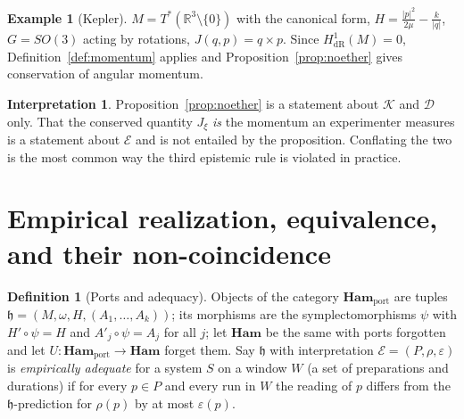 \documentclass[10pt,a4paper]{article}
\theoremstyle{plain}
\theoremstyle{definition}
\newtheorem{definition}[theorem]{Definition}
\newtheorem{interpretation}[theorem]{Interpretation}
\newtheorem{example}[theorem]{Example}
\newcommand{\Ham}{\mathbf{Ham}}
\newcommand{\HamP}{\mathbf{Ham}_{\mathrm{port}}}
\newcommand{\dR}{\mathrm{dR}}
\newcommand{\R}{\mathbb{R}}
\begin{document}
\begin{example}[Kepler]
\label{ex:kepler}
$M = T^*(\R^3\setminus\{0\})$ with the canonical form, $H = \frac{|p|^2}{2\mu} - \frac{k}{|q|}$, $G = SO(3)$ acting by rotations, $J(q,p) = q\times p$. Since $H^1_{\dR}(M) = 0$, Definition~\ref{def:momentum} applies and Proposition~\ref{prop:noether} gives conservation of angular momentum.
\end{example}

\begin{interpretation}
\label{int:noether}
Proposition~\ref{prop:noether} is a statement about $\mathcal{K}$ and $\mathcal{D}$ only. That the conserved quantity $J_\xi$ \emph{is} the momentum an experimenter measures is a statement about $\mathcal{E}$ and is not entailed by the proposition. Conflating the two is the most common way the third epistemic rule is violated in practice.
\end{interpretation}

\section{Empirical realization, equivalence, and their non-coincidence}
\label{sec:empirical}

\begin{definition}[Ports and adequacy]
\label{def:portmorph}
Objects of the category $\HamP$ are tuples
$\mathfrak{h} = (M,\omega,H,(A_1,\dots,A_k))$; its morphisms are the symplectomorphisms $\psi$ with $H'\circ\psi = H$ and $A'_j\circ\psi = A_j$ for all $j$; let $\Ham$ be the same with ports forgotten and let $U:\HamP\to\Ham$ forget them. Say $\mathfrak{h}$ with interpretation $\mathcal{E} = (P,\rho,\varepsilon)$ is \emph{empirically adequate} for a system $S$ on a window $W$ (a set of preparations and durations) if for every $p \in P$ and every run in $W$ the reading of $p$ differs from the $\mathfrak{h}$-prediction for $\rho(p)$ by at most $\varepsilon(p)$.
\end{definition}
\end{document}
